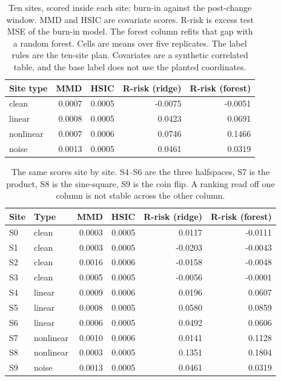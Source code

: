 \begin{table}[t]
\centering
\caption{Ten sites, scored inside each site: burn-in against the post-change window. MMD and HSIC are covariate scores. R-risk is excess test MSE of the burn-in model. The forest column refits that gap with a random forest. Cells are means over five replicates. The label rules are the ten-site plan. Covariates are a synthetic correlated table, and the base label does not use the planted coordinates.}
\label{tab:ten-site-board}
\begin{tabular}{lrrrr}
\toprule
Site type & MMD & HSIC & R-risk (ridge) & R-risk (forest) \\
\midrule
clean & 0.0007 & 0.0005 & -0.0075 & -0.0051 \\
linear & 0.0008 & 0.0005 & 0.0423 & 0.0691 \\
nonlinear & 0.0007 & 0.0006 & 0.0746 & 0.1466 \\
noise & 0.0013 & 0.0005 & 0.0461 & 0.0319 \\
\bottomrule
\end{tabular}
\end{table}

\begin{table}[t]
\centering
\caption{The same scores site by site. S4--S6 are the three halfspaces, S7 is the product, S8 is the sine-square, S9 is the coin flip. A ranking read off one column is not stable across the other column.}
\label{tab:ten-site-board-sites}
\begin{tabular}{llrrrr}
\toprule
Site & Type & MMD & HSIC & R-risk (ridge) & R-risk (forest) \\
\midrule
S0 & clean & 0.0003 & 0.0005 & 0.0117 & -0.0111 \\
S1 & clean & 0.0003 & 0.0005 & -0.0203 & -0.0043 \\
S2 & clean & 0.0016 & 0.0006 & -0.0158 & -0.0048 \\
S3 & clean & 0.0005 & 0.0005 & -0.0056 & -0.0001 \\
S4 & linear & 0.0009 & 0.0006 & 0.0196 & 0.0607 \\
S5 & linear & 0.0008 & 0.0005 & 0.0580 & 0.0859 \\
S6 & linear & 0.0006 & 0.0005 & 0.0492 & 0.0606 \\
S7 & nonlinear & 0.0010 & 0.0006 & 0.0141 & 0.1128 \\
S8 & nonlinear & 0.0003 & 0.0005 & 0.1351 & 0.1804 \\
S9 & noise & 0.0013 & 0.0005 & 0.0461 & 0.0319 \\
\bottomrule
\end{tabular}
\end{table}
